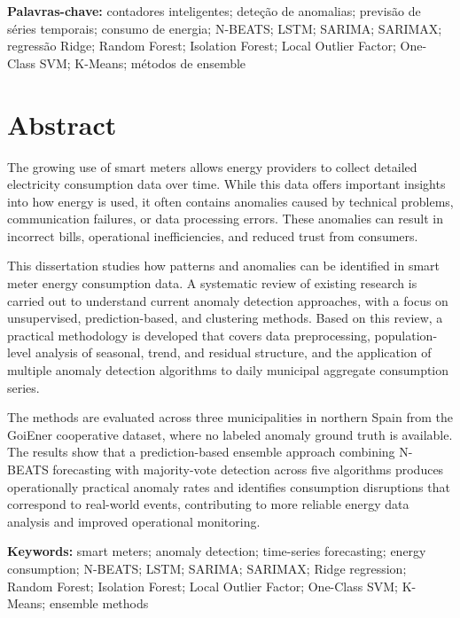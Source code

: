﻿\documentclass[12pt,reqno, twoside]{amsbook}
\numberwithin{figure}{chapter}
\numberwithin{table}{chapter}
\numberwithin{equation}{chapter}
\theoremstyle{plain}
\numberwithin{equation}{chapter}
\numberwithin{section}{chapter}
\begin{document}
\vspace{\baselineskip}
\noindent\textbf{Palavras-chave:} contadores inteligentes; deteção de anomalias; previsão de séries temporais; consumo de energia; N-BEATS; LSTM; SARIMA; SARIMAX; regressão Ridge; Random Forest; Isolation Forest; Local Outlier Factor; One-Class SVM; K-Means; métodos de ensemble


\chapter*{Abstract}

The growing use of smart meters allows energy providers to collect detailed electricity consumption data over time. While this data offers important insights into how energy is used, it often contains anomalies caused by technical problems, communication failures, or data processing errors. These anomalies can result in incorrect bills, operational inefficiencies, and reduced trust from consumers.

This dissertation studies how patterns and anomalies can be identified in smart meter energy consumption data. A systematic review of existing research is carried out to understand current anomaly detection approaches, with a focus on unsupervised, prediction-based, and clustering methods. Based on this review, a practical methodology is developed that covers data preprocessing, population-level analysis of seasonal, trend, and residual structure, and the application of multiple anomaly detection algorithms to daily municipal aggregate consumption series.

The methods are evaluated across three municipalities in northern Spain from the GoiEner cooperative dataset, where no labeled anomaly ground truth is available. The results show that a prediction-based ensemble approach combining N-BEATS forecasting with majority-vote detection across five algorithms produces operationally practical anomaly rates and identifies consumption disruptions that correspond to real-world events, contributing to more reliable energy data analysis and improved operational monitoring.

\vspace{\baselineskip}
\noindent\textbf{Keywords:} smart meters; anomaly detection; time-series forecasting; energy consumption; N-BEATS; LSTM; SARIMA; SARIMAX; Ridge regression; Random Forest; Isolation Forest; Local Outlier Factor; One-Class SVM; K-Means; ensemble methods


\tableofcontents
\end{document}
